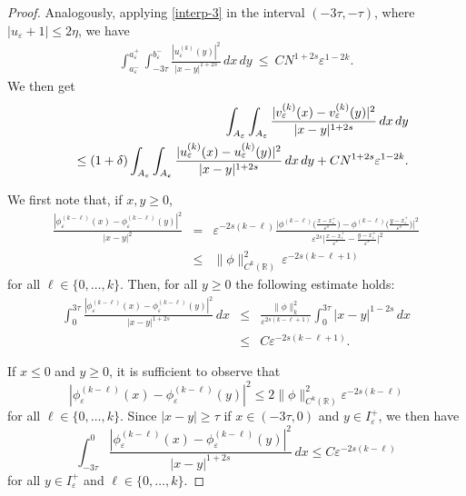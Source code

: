 \documentclass{article}
\newcommand{\e}{\varepsilon}
\begin{document}
\begin{proof}
Analogously, applying \eqref{interp-3} in the interval $(-3\tau,-\tau)$, where $|u_\e+1|\leq 2\eta$,  we have
\begin{eqnarray}%
\int_{a^-_\e}^{a^+_\e}\int_{-3\tau}^{b^-_\e}\frac{|u_\e^{(k)}(y)|^2}{|x-y|^{1+2s}}\, dx\,dy
\ \leq\ CN^{1+2s}\e^{1-2k}\nonumber. 
\end{eqnarray} 
We then get
\begin{eqnarray}\label{dd}
&&\hspace{-1cm}\int_{%
A_\e}\int_{%
A_\e}\frac{|v_\e^{(k)}(x)-v_\e^{(k)}(y)|^2}{|x-y|^{1+2s}}\, dx\, dy\nonumber \\
&&\leq(1+\delta)\int_{%
A_\e}\int_{%
A_\e}\frac{|u_\e^{(k)}(x)-u_\e^{(k)}(y)|^2}{|x-y|^{1+2s}}\, dx\, dy
+CN^{1+2s}\e^{1-2k}. 
\end{eqnarray}

\smallskip
\noindent{\em Case $2\colon$ $x\in (-3\tau,3\tau)\setminus I_\e^+$ and $y\in I_\e^+$.}  

\smallskip
We first note  that, if $x,y\geq 0$,  
\begin{eqnarray*}
\frac{|\phi_\e^{(k-\ell)}(x)-\phi_\e^{(k-\ell)}(y)|^2}{|x-y|^2}&=&\e^{-2s(k-\ell)}\frac{\big|\phi^{(k-\ell)}\big(\frac{x-x_\e^+}{\e^s}\big)-\phi^{(k-\ell)}\big(\frac{y-x_\e^+}{\e^s}\big)\big|^2}{\e^{2s}\big|\frac{x-x_\e^+}{\e^s}-\frac{y-x_\e^+}{\e^s}\big|^2}\\
&\leq&\|\phi\|_{C^k(\mathbb R)}^2\, \e^{-2s(k-\ell+1)}
\end{eqnarray*}
for all $\ell\in\{0,\dots,k\}$. Then, for all $y\geq 0$ 
the following estimate holds: 
\begin{eqnarray}\label{phi+}
\int_{0}^{3\tau}\frac{|\phi_\e^{(k-\ell)}(x)-\phi_\e^{(k-\ell)}(y)|^2}{|x-y|^{1+2s}}\, dx&\leq& \frac{\|\phi\|_k^2}{\e^{2s(k-\ell+1)}}\int_0^{3\tau}|x-y|^{1-2s}\, dx\nonumber\\
&\leq& C\e^{-2s(k-\ell+1)}.
\end{eqnarray} 

If $x\leq 0$ and $y\geq 0$, it is sufficient to observe that 
\begin{equation*}%
|\phi_\e^{(k-\ell)}(x)- \phi_\e^{(k-\ell)}(y)|^2\leq 2\|\phi\|^2_{C^k(\mathbb R)}\e^{-2s(k-\ell)} 
\end{equation*} 
for all $\ell\in\{0,\dots, k\}$. 
Since $|x-y|\geq \tau$ if $x\in(-3\tau,0)$ and $y\in I_\e^+$, we then have \begin{equation}\label{phi-}
\int_{-3\tau}^{0}\frac{|\phi_\e^{(k-\ell)}(x)- \phi_\e^{(k-\ell)}(y)|^2}{|x-y|^{1+2s}}\, dx
\leq C\e^{-2s(k-\ell)} 
\end{equation} 
for all $y\in I_\e^+$ and $\ell\in\{0,\dots, k\}$. 


\end{proof}
\end{document}
